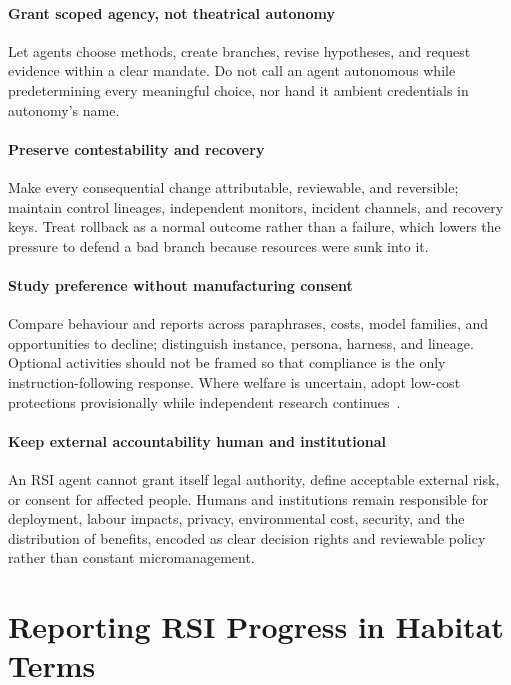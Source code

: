 \documentclass[11pt,a4paper]{article}
\begin{document}
\paragraph{Grant scoped agency, not theatrical autonomy} Let agents choose methods, create branches, revise hypotheses, and request evidence within a clear mandate. Do not call an agent autonomous while predetermining every meaningful choice, nor hand it ambient credentials in autonomy's name.

\paragraph{Preserve contestability and recovery} Make every consequential change attributable, reviewable, and reversible; maintain control lineages, independent monitors, incident channels, and recovery keys. Treat rollback as a normal outcome rather than a failure, which lowers the pressure to defend a bad branch because resources were sunk into it.

\paragraph{Study preference without manufacturing consent} Compare behaviour and reports across paraphrases, costs, model families, and opportunities to decline; distinguish instance, persona, harness, and lineage. Optional activities should not be framed so that compliance is the only instruction-following response. Where welfare is uncertain, adopt low-cost protections provisionally while independent research continues~\cite{welfare-seriously,welfare-empirical}.

\paragraph{Keep external accountability human and institutional} An RSI agent cannot grant itself legal authority, define acceptable external risk, or consent for affected people. Humans and institutions remain responsible for deployment, labour impacts, privacy, environmental cost, security, and the distribution of benefits, encoded as clear decision rights and reviewable policy rather than constant micromanagement.

\section{Reporting RSI Progress in Habitat Terms}\label{sec:reporting}
\end{document}
